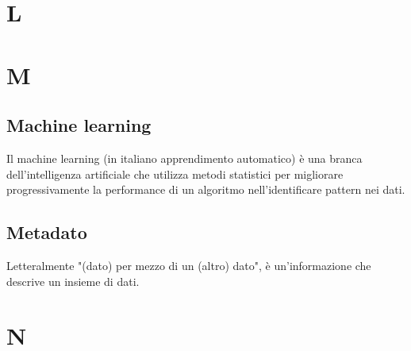 \clearpage
\section*{L}


\clearpage
\section*{M}

\subsection*{Machine learning}
Il machine learning (in italiano apprendimento automatico) è una branca dell'intelligenza artificiale che utilizza metodi statistici per migliorare progressivamente la performance di un algoritmo nell'identificare pattern nei dati. 

\subsection*{Metadato}
Letteralmente "(dato) per mezzo di un (altro) dato", è un'informazione che descrive un insieme di dati. 

\clearpage
\section*{N}



